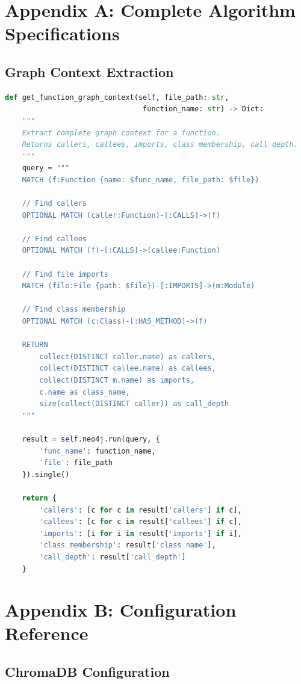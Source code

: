 \documentclass[11pt,letterpaper]{article}
\begin{document}
\section{Appendix A: Complete Algorithm Specifications}

\subsection{Graph Context Extraction}

\begin{lstlisting}[language=Python, caption=Complete graph context extraction]
def get_function_graph_context(self, file_path: str, 
                                function_name: str) -> Dict:
    """
    Extract complete graph context for a function.
    Returns callers, callees, imports, class membership, call depth.
    """
    query = """
    MATCH (f:Function {name: $func_name, file_path: $file})
    
    // Find callers
    OPTIONAL MATCH (caller:Function)-[:CALLS]->(f)
    
    // Find callees
    OPTIONAL MATCH (f)-[:CALLS]->(callee:Function)
    
    // Find file imports
    MATCH (file:File {path: $file})-[:IMPORTS]->(m:Module)
    
    // Find class membership
    OPTIONAL MATCH (c:Class)-[:HAS_METHOD]->(f)
    
    RETURN 
        collect(DISTINCT caller.name) as callers,
        collect(DISTINCT callee.name) as callees,
        collect(DISTINCT m.name) as imports,
        c.name as class_name,
        size(collect(DISTINCT caller)) as call_depth
    """
    
    result = self.neo4j.run(query, {
        'func_name': function_name,
        'file': file_path
    }).single()
    
    return {
        'callers': [c for c in result['callers'] if c],
        'callees': [c for c in result['callees'] if c],
        'imports': [i for i in result['imports'] if i],
        'class_membership': result['class_name'],
        'call_depth': result['call_depth']
    }
\end{lstlisting}

\section{Appendix B: Configuration Reference}

\subsection{ChromaDB Configuration}
\end{document}
